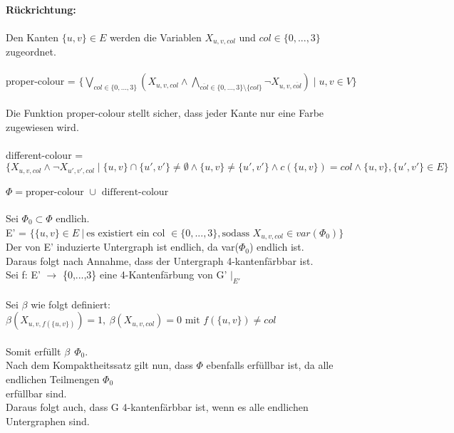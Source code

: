 \documentclass[a4paper,10pt]{article}
\begin{document}
	\ \\ \textbf{Rückrichtung:} \\
	\\
	Den Kanten $\{ u,v \} \in E$ werden die Variablen $X_{u,v,col}$ und $col \in \{0,...,3\}$ zugeordnet.\\
	\\
	proper-colour = 
	\( \{ \bigvee\limits_{col \in \{0,...,3\}} (X_{u,v,col} \wedge \bigwedge\limits_{\overline{col} \in \{0,...,3\}\setminus{ \{ col \} } } 
	\neg X_{u,v,\overline{col}}) \mid u,v \in V \} \) \\	
	\\
	Die Funktion proper-colour stellt sicher, dass jeder Kante nur eine Farbe zugewiesen wird.\\
	\\
	different-colour = \\
	\( \{ X_{u,v,col} \wedge \neg X_{u',v',col}\mid
	\{ u,v \} \cap \{ u',v' \} \neq \emptyset \wedge 
	\{ u,v \} \neq \{ u',v' \} \wedge 
	c(\{ u,v \}) = col \wedge 
	\{u,v\},\{u',v'\} \in E \} \) \\
	\\	
	\(\Phi = \text{proper-colour } \cup \text{ different-colour} \)\\
	\\
	Sei $\Phi_0 \subset \Phi$ endlich.\\
	E' = $\{ \{u,v\} \in E~|~\text{es existiert ein col } \in \{0,...,3\}, \text{sodass } X_{u,v,col} \in var(\Phi_0) \}$ \\
	Der von E' induzierte Untergraph ist endlich, da var($\Phi_0$) endlich ist.\\
	Daraus folgt nach Annahme, dass der Untergraph 4-kantenfärbbar ist.\\
	Sei f: E' $\rightarrow$ \{0,...,3\} eine 4-Kantenfärbung von G' $|_{E'}$\\
	\\
	Sei $\beta$ wie folgt definiert: \\
	\(\beta(X_{u,v,f(\{ u,v \})}) = 1,~\beta(X_{u,v,col}) = 0 \text{ mit } f(\{ u,v \}) \neq col \) \\
	\\
	Somit erfüllt $\beta~~\Phi_0$.\\
	Nach dem Kompaktheitssatz gilt nun, dass $\Phi$ ebenfalls erfüllbar ist, da alle endlichen Teilmengen $\Phi_0$\\
	erfüllbar sind.\\
	Daraus folgt auch, dass G 4-kantenfärbbar ist, wenn es alle endlichen Untergraphen sind.\\	
	
\end{document}
